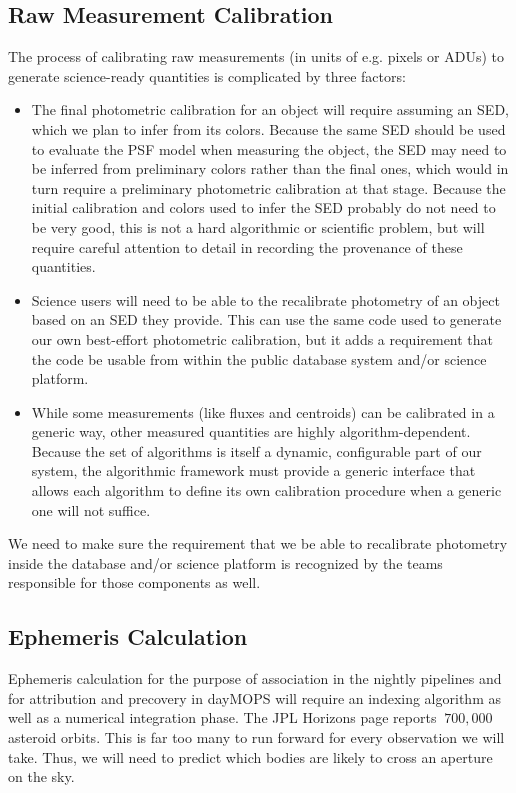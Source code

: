 \subsection{Raw Measurement Calibration}
\label{sec:acRawMeasurementCalibration}

The process of calibrating raw measurements (in units of e.g. pixels or ADUs) to generate science-ready quantities is complicated by three factors:
\begin{itemize}
    \item The final photometric calibration for an object will require assuming an SED, which we plan to infer from its colors.  Because the same SED should be used to evaluate the PSF model when measuring the object, the SED may need to be inferred from preliminary colors rather than the final ones, which would in turn require a preliminary photometric calibration at that stage.  Because the initial calibration and colors used to infer the SED probably do not need to be very good, this is not a hard algorithmic or scientific problem, but will require careful attention to detail in recording the provenance of these quantities.
    \item Science users will need to be able to the recalibrate photometry of an object based on an SED they provide.  This can use the same code used to generate our own best-effort photometric calibration, but it adds a requirement that the code be usable from within the public database system and/or science platform.
    \item While some measurements (like fluxes and centroids) can be calibrated in a generic way, other measured quantities are highly algorithm-dependent.  Because the set of algorithms is itself a dynamic, configurable part of our system, the algorithmic framework must provide a generic interface that allows each algorithm to define its own calibration procedure when a generic one will not suffice.
\end{itemize}

\begin{note}[JFB]
    We need to make sure the requirement that we be able to recalibrate photometry inside the database and/or science platform is recognized by the teams responsible for those components as well.
\end{note}

\subsection{Ephemeris Calculation}
\label{sec:acEphemerisCalculation}
Ephemeris calculation for the purpose of association in the nightly pipelines and for attribution and precovery in dayMOPS will require an indexing algorithm as well as a numerical integration phase. The JPL Horizons page reports $~700,000$ asteroid orbits.  This is far too many to run forward for every observation we will take.  Thus, we will need to predict which bodies are likely to cross an aperture on the sky.

